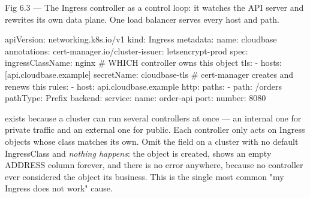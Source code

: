 \begin{wbfigure}{Fig 6.3 — The Ingress controller as a control loop: it watches the API server and rewrites its own data plane. One load balancer serves every host and path.}
\end{wbfigure}

\begin{k8sbox}
apiVersion: networking.k8s.io/v1
kind: Ingress
metadata:
  name: cloudbase
  annotations:
    cert-manager.io/cluster-issuer: letsencrypt-prod
spec:
  ingressClassName: nginx        # WHICH controller owns this object
  tls:
    - hosts: [api.cloudbase.example]
      secretName: cloudbase-tls  # cert-manager creates and renews this
  rules:
    - host: api.cloudbase.example
      http:
        paths:
          - path: /orders
            pathType: Prefix
            backend:
              service:
                name: order-api
                port: { number: 8080 }
\end{k8sbox}

\begin{behind}
 exists because a cluster can run several controllers at once --- an internal one for private traffic and an external one for public. Each controller only acts on Ingress objects whose class matches its own. Omit the field on a cluster with no default IngressClass and \emph{nothing happens}: the object is created,  shows an empty ADDRESS column forever, and there is no error anywhere, because no controller ever considered the object its business. This is the single most common "my Ingress does not work" cause.
\end{behind}

